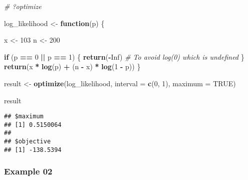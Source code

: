 \documentclass[
]{article}
\newenvironment{Shaded}{\begin{snugshade}}{\end{snugshade}}
\newcommand{\AttributeTok}[1]{\textcolor[rgb]{0.13,0.29,0.53}{#1}}
\newcommand{\CommentTok}[1]{\textcolor[rgb]{0.56,0.35,0.01}{\textit{#1}}}
\newcommand{\ConstantTok}[1]{\textcolor[rgb]{0.56,0.35,0.01}{#1}}
\newcommand{\ControlFlowTok}[1]{\textcolor[rgb]{0.13,0.29,0.53}{\textbf{#1}}}
\newcommand{\DecValTok}[1]{\textcolor[rgb]{0.00,0.00,0.81}{#1}}
\newcommand{\FunctionTok}[1]{\textcolor[rgb]{0.13,0.29,0.53}{\textbf{#1}}}
\newcommand{\NormalTok}[1]{#1}
\newcommand{\OtherTok}[1]{\textcolor[rgb]{0.56,0.35,0.01}{#1}}
\newcommand{\SpecialCharTok}[1]{\textcolor[rgb]{0.81,0.36,0.00}{\textbf{#1}}}
\begin{document}
\begin{Shaded}
\begin{Highlighting}[]
\CommentTok{\# ?optimize}

\NormalTok{log\_likelihood }\OtherTok{\textless{}{-}} \ControlFlowTok{function}\NormalTok{(p) \{}
  
\NormalTok{  x }\OtherTok{\textless{}{-}} \DecValTok{103}
\NormalTok{  n }\OtherTok{\textless{}{-}} \DecValTok{200}
  
 
  \ControlFlowTok{if}\NormalTok{ (p }\SpecialCharTok{==} \DecValTok{0} \SpecialCharTok{||}\NormalTok{ p }\SpecialCharTok{==} \DecValTok{1}\NormalTok{) \{}
    \FunctionTok{return}\NormalTok{(}\SpecialCharTok{{-}}\ConstantTok{Inf}\NormalTok{)  }\CommentTok{\# To avoid log(0) which is undefined}
\NormalTok{  \}}
  \FunctionTok{return}\NormalTok{(x }\SpecialCharTok{*} \FunctionTok{log}\NormalTok{(p) }\SpecialCharTok{+}\NormalTok{ (n }\SpecialCharTok{{-}}\NormalTok{ x) }\SpecialCharTok{*} \FunctionTok{log}\NormalTok{(}\DecValTok{1} \SpecialCharTok{{-}}\NormalTok{ p))}
\NormalTok{\}}


\NormalTok{result }\OtherTok{\textless{}{-}} \FunctionTok{optimize}\NormalTok{(log\_likelihood, }\AttributeTok{interval =} \FunctionTok{c}\NormalTok{(}\DecValTok{0}\NormalTok{, }\DecValTok{1}\NormalTok{), }\AttributeTok{maximum =} \ConstantTok{TRUE}\NormalTok{)}


\NormalTok{result}
\end{Highlighting}
\end{Shaded}

\begin{verbatim}
## $maximum
## [1] 0.5150064
## 
## $objective
## [1] -138.5394
\end{verbatim}

\subsubsection{Example 02}\label{example-02}
\end{document}
